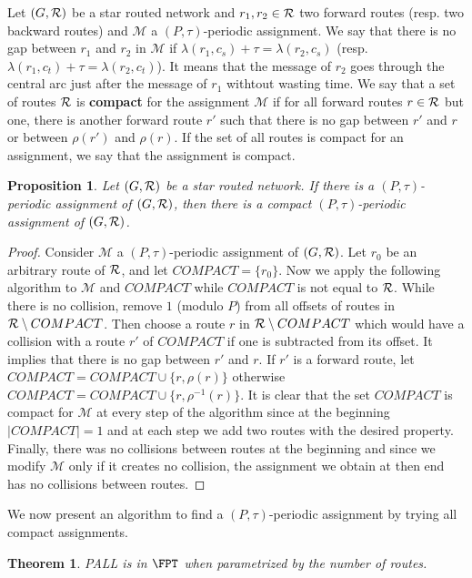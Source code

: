 \documentclass[a4paper,10pt]{article}
\newtheorem{proposition}{Proposition}
\newtheorem{theorem}{Theorem}
\begin{document}
{Let $(G, {\cal R})$ be a star routed network and $r_1,r_2 \in {\cal R}$ two forward routes (resp. two backward routes) and 
$\mathcal{M}$ a $(P,\tau)$-periodic assignment. We say that there is no gap between $r_1$ and $r_2$ in $\mathcal{M}$ if $\lambda(r_1,c_s) + \tau = \lambda(r_2,c_s)$ (resp. $\lambda(r_1,c_t) + \tau = \lambda(r_2,c_t)$). It means that the message of $r_2$ goes through the central arc just after the message of $r_1$ withtout wasting time. We say that a set of routes ${\cal R}$ is \textbf{compact} for the assignment $\mathcal{M}$ if for all forward routes $r \in {\cal R}$ but one, there is another forward route $r'$ such that there is no gap between $r'$ and $r$ or between $\rho(r')$ and  $\rho(r)$. If the set of all routes is compact for an assignment, we say that the assignment is compact.

\begin{proposition}
Let $(G, {\cal R})$ be a star routed network. If there is a $(P,\tau)$-periodic assignment of $(G, {\cal R})$,
then there is a compact $(P,\tau)$-periodic assignment of $(G, {\cal R})$.
\end{proposition}
\begin{proof}
Consider $\mathcal{M}$ a $(P,\tau)$-periodic assignment of $(G, {\cal R})$.
Let $r_0$ be an arbitrary route of ${\cal R}$,  and let $COMPACT = \{r_0\}$. Now we apply the following algorithm to $\mathcal{M}$ and $COMPACT$ while $COMPACT$ is not equal to ${\cal R}$.
While there is no collision, remove $1$ (modulo $P$) from all offsets of routes in ${\cal R} \setminus COMPACT$. Then choose a route $r$ in ${\cal R} \setminus COMPACT$ which would have a collision with a route $r'$ of $COMPACT$ if one is subtracted from its offset.
It implies that there is no gap between $r'$ and $r$. If $r'$ is a forward route, let $COMPACT = COMPACT \cup \{r, \rho(r)\}$ otherwise  $COMPACT = COMPACT \cup \{r, \rho^{-1}(r)\}$. It is clear that the set $COMPACT$ is compact for $\mathcal{M}$ at every step of the algorithm since at the beginning $|COMPACT| = 1$ and at each step we add two routes with the desired property. 
Finally, there was no collisions between routes at the beginning and since we modify $\mathcal{M}$ only if it creates no collision,
the assignment we obtain at then end has no collisions between routes.
\end{proof}

We now present an algorithm to find a $(P,\tau)$-periodic assignment 
by trying all compact assignments.

\begin{theorem}
PALL is in $\FPT$ when parametrized by the number of routes.
\end{theorem}

}
\end{document}
